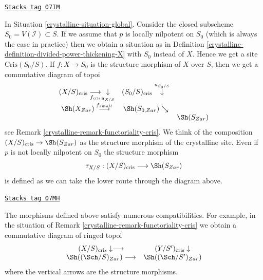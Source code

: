 \begin{remark}

\label{crystalline-remark-structure-morphism}
\href{https://stacks.math.columbia.edu/tag/07IM}{\texttt{Stacks tag 07IM}}

In Situation \ref{crystalline-situation-global}.
Consider the closed subscheme $S_0 = V(\mathcal{I}) \subset S$.
If we assume that $p$ is locally nilpotent on $S_0$ (which is always
the case in practice) then we obtain a situation as in
Definition \ref{crystalline-definition-divided-power-thickening-X} with $S_0$ instead
of $X$. Hence we get a site $\text{Cris}(S_0/S)$. If $f : X \to S_0$
is the structure morphism of $X$ over $S$, then we get a
commutative diagram of topoi
$$
\begin{array}{ccc}(X/S)_{\text{cris}}
\underset{f_{\text{cris}}}{\longrightarrow}\underset{u_{X/S}}{\downarrow} & (S_0/S)_{\text{cris}} \overset{u_{S_0/S}}{\downarrow} &  \\ \Sh(X_{Zar}) \overset{f_{small}}{\longrightarrow} & \Sh(S_{0, Zar}) \searrow &  \\  &  & \Sh(S_{Zar})\end{array}
$$
see Remark \ref{crystalline-remark-functoriality-cris}. We think of the composition
$(X/S)_{\text{cris}} \to \Sh(S_{Zar})$ as the structure morphism of the
crystalline site. Even if $p$ is not locally nilpotent on $S_0$
the structure morphism
$$
\tau_{X/S} : (X/S)_{\text{cris}} \longrightarrow \Sh(S_{Zar})
$$
is defined as we can take the lower route through the diagram above.
\end{remark}

\begin{remark}[Compatibilities]

\label{crystalline-remark-compatibilities}
\href{https://stacks.math.columbia.edu/tag/07MH}{\texttt{Stacks tag 07MH}}

The morphisms defined above satisfy numerous compatibilities. For example,
in the situation of Remark \ref{crystalline-remark-functoriality-cris}
we obtain a commutative diagram of ringed topoi
$$
\begin{array}{cc}(X/S)_{\text{cris}} \downarrow\longrightarrow & (Y/S')_{\text{cris}} \downarrow \\ \Sh((\Sch/S)_{Zar}) \longrightarrow & \Sh((\Sch/S')_{Zar})\end{array}
$$
where the vertical arrows are the structure morphisms.
\end{remark}

